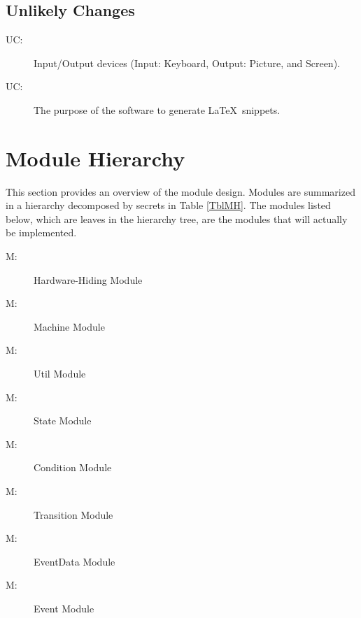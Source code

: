\documentclass[12pt, titlepage]{article}
\newcounter{ucnum}
\newcommand{\uctheucnum}{UC\theucnum}
\newcounter{mnum}
\newcommand{\mthemnum}{M\themnum}
\begin{document}
\subsection{Unlikely Changes} \label{SecUchange}

\begin{description}
\item[ \uctheucnum :] Input/Output devices
  (Input: Keyboard, Output: Picture, and Screen).
\item[ \uctheucnum :] The purpose of the software to generate \LaTeX\ snippets.
\end{description}

\section{Module Hierarchy} \label{SecMH}

This section provides an overview of the module design. Modules are summarized
in a hierarchy decomposed by secrets in Table \ref{TblMH}. The modules listed
below, which are leaves in the hierarchy tree, are the modules that will
actually be implemented.

\begin{description}
\item [ \mthemnum \label{mHH}:] Hardware-Hiding Module
\item [ \mthemnum \label{mMachine}:] Machine Module
\item [ \mthemnum \label{mUtil}:] Util Module
\item [ \mthemnum \label{mState}:] State Module
\item [ \mthemnum \label{mCondition}:] Condition Module
\item [ \mthemnum \label{mTransition}:] Transition Module
\item [ \mthemnum \label{mEventData}:] EventData Module
\item [ \mthemnum \label{mEvent}:] Event Module
\end{description}
\end{document}
